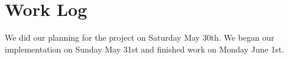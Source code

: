 \documentclass[paper=a4, fontsize=11pt]{scrartcl} %
\numberwithin{equation}{section} %
\numberwithin{figure}{section} %
\numberwithin{table}{section} %
\begin{document}
\section*{Work Log}

\hline
We did our planning for the project on Saturday May 30th. We began our implementation on 
Sunday May 31st and finished work on Monday June 1st.






\end{document}
